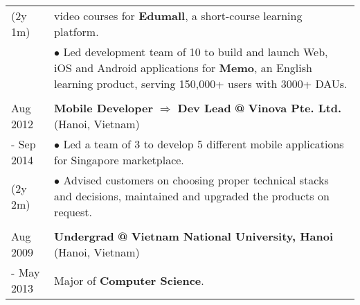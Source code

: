 \documentclass[12pt]{extarticle}
\makeatletter
\newcommand{\primary}[1]{\textcolor{primary}{\textbf{#1}}}
\newcommand{\secondary}[1]{\textcolor{secondary}{\textbf{#1}}}
\newcommand{\tertiary}[1]{\textcolor{tertiary}{#1}}
\newcommand{\tbullet}{\textcolor{tertiary}{\textbf{$\bullet$ }}}
\newcommand{\at}{\textcolor{tertiary}{\textbf{@ }}}
\newcommand{\then}{\textcolor{tertiary}{\textbf{$\Rightarrow$ }}}
\makeatother
\begin{document}
\begin{tabularx}{\textwidth}{@{} >{\raggedleft}p{2.25cm} | X @{}}
   (2y 1m) & video courses for \secondary{Edumall}, a short-course learning platform. \\
           & \tbullet Led development team of 10 to build and launch Web, iOS and Android applications for \secondary{Memo},
           an English learning product, serving 150,000+ users with 3000+ DAUs. \\
  \\
  Aug 2012 & \primary{Mobile Developer} \then \primary{Dev Lead} \at \primary{Vinova Pte. Ltd.} \tertiary{(Hanoi, Vietnam)} \\
- Sep 2014 & \tbullet Led a team of 3 to develop 5 different mobile applications for Singapore marketplace. \\
   (2y 2m) & \tbullet Advised customers on choosing proper technical stacks and decisions, maintained and upgraded the products on request. \\
  \\
  Aug 2009 & \primary{Undergrad} \at \primary{Vietnam National University, Hanoi} \tertiary{(Hanoi, Vietnam)} \\
- May 2013 & Major of \secondary{Computer Science}. \\
\end{tabularx}
\end{document}
